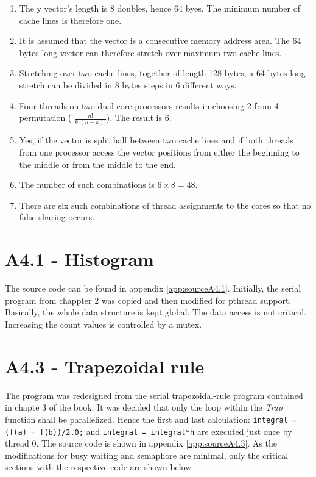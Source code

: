 \documentclass[a4paper,11pt,twoside]{article}
\begin{document}
\begin{enumerate}[label={\alph*)}]
\item The y vector's length is 8 doubles, hence 64 byes. The minimum number of cache lines is therefore one.

\item It is assumed that the vector is a consecutive memory address area. The 64 bytes long vector can therefore stretch over maximum two cache lines.

\item Stretching over two cache lines, together of length 128 bytes, a 64 bytes long stretch can be divided in 8 bytes steps in 6 different ways. 

\item Four threads on two dual core processors results in choosing 2 from 4 permutation ( $\frac{n!}{k!(n-k)!}$). The result is 6.
\item Yes, if the vector is split half between two cache lines and if both threads from one processor access the vector positions from either the beginning to the middle or from the middle to the end.

\item The number of such combinations is $6 \times 8 = 48$.

\item There are six such combinations of thread assignments to the cores so that no false sharing occurs.

\end{enumerate}

\section{A4.1 - Histogram}
The source code can be found in appendix \ref{app:sourceA4.1}. Initially, the serial program from chappter 2 was copied and then modified for pthread support. Basically, the whole data structure is kept global. The data access is not critical. Increasing the count values is controlled by a mutex.

\section{A4.3 - Trapezoidal rule}
The program was redesigned from the serial trapezoidal-rule program contained in chapte 3 of the book. It was decided that only the loop within the \textit{Trap} function shall be parallelized. Hence the first and last calculation: \verb!integral = (f(a) + f(b))/2.0;! and \verb!integral = integral*h! are executed just once by thread 0. The source code is shown in appendix \ref{app:sourceA4.3}. As the modifications for busy waiting and semaphore are minimal, only the critical sections with the respective code are shown below
\end{document}
